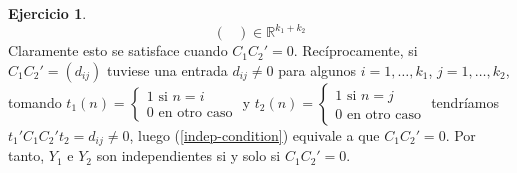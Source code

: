 \documentclass[12pt,spanish]{article}
\theoremstyle{definition}
\newtheorem{exercise}{Ejercicio}
\begin{document}
\begin{exercise}
\begin{equation}
\begin{pmatrix}
    \end{pmatrix}\in\mathbb{R}^{k_1+k_2}\end{equation}
  Claramente esto se satisface cuando $C_1C_2'=0$. Recíprocamente, si
  $C_1C_2'=(d_{ij})$ tuviese una entrada $d_{ij}\neq 0$ para algunos
  $i=1,\ldots,k_1$, $j=1,\ldots,k_2$, tomando $t_1(n)=
  \begin{cases}
    1 \text{ si } n=i \\
    0 \text{ en otro caso}
  \end{cases}
  $ y $t_2(n)=
  \begin{cases}
    1 \text{ si } n=j \\
    0 \text{ en otro caso}
  \end{cases}
  $ tendríamos $t_1'C_1C_2't_2=d_{ij}\neq 0$, luego
  (\ref{indep-condition}) equivale a que $C_1C_2'=0$. Por tanto, $Y_1$
  e $Y_2$ son independientes si y solo si $C_1C_2'=0$.
\end{exercise}
\end{document}
